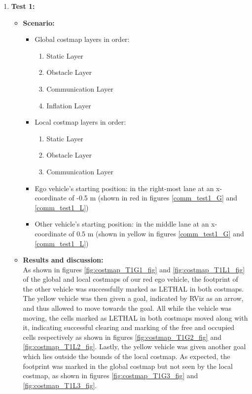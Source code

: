\begin{itemize}
    \begin{enumerate}
        \item \textbf{Test 1:}
            \begin{itemize}
                \item \textbf{Scenario:}
                \begin{itemize}
                    \item Global costmap layers in order:
                \begin{enumerate}
                    \item Static Layer
                    \item Obstacle Layer
                    \item Communication Layer
                    \item Inflation Layer
                \end{enumerate}
                    \item Local costmap layers in order:
                \begin{enumerate}
                    \item Static Layer
                    \item Obstacle Layer
                    \item Communication Layer
                \end{enumerate}
                    \item Ego vehicle’s starting position: in the right-most lane at an x-coordinate of -0.5 m (shown in red in figures \ref{comm_test1_G} and \ref{comm_test1_L})
                    \item Other vehicle’s starting position: in the middle lane at an x-coordinate of 0.5 m (shown in yellow in figures \ref{comm_test1_G} and \ref{comm_test1_L})
                \end{itemize}

                \item \textbf{Results and discussion:} \\
                As shown in figures \ref{fig:costmap_T1G1_fig} and \ref{fig:costmap_T1L1_fig} of the global and local costmaps of our red ego vehicle, the footprint of the other vehicle was successfully marked as LETHAL in both costmaps. The yellow vehicle was then given a goal, indicated by RViz as an arrow, and thus allowed to move towards the goal. All while the vehicle was moving, the cells marked as LETHAL in both costmaps moved along with it, indicating successful clearing and marking of the free and occupied cells respectively as shown in figures \ref{fig:costmap_T1G2_fig} and \ref{fig:costmap_T1L2_fig}. Lastly, the yellow vehicle was given another goal which lies outside the bounds of the local costmap. As expected, the footprint was marked in the global costmap but not seen by the local costmap, as shown in figures \ref{fig:costmap_T1G3_fig} and \ref{fig:costmap_T1L3_fig}.
                

\end{itemize}
\end{enumerate}
\end{itemize}

